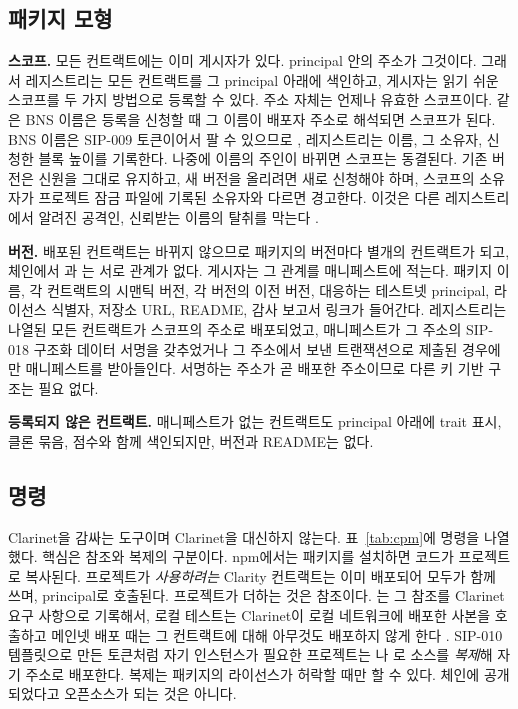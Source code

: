 \subsection{패키지 모형}

\textbf{스코프.} 모든 컨트랙트에는 이미 게시자가 있다. principal 안의 주소가 그것이다. 그래서 레지스트리는 모든 컨트랙트를 그 principal 아래에 색인하고, 게시자는 읽기 쉬운 스코프를 두 가지 방법으로 등록할 수 있다. 주소 자체는 언제나 유효한 스코프이다.  같은 BNS 이름은 등록을 신청할 때 그 이름이 배포자 주소로 해석되면 스코프가 된다. BNS 이름은 SIP-009 토큰이어서 팔 수 있으므로 \cite{bnsv2}, 레지스트리는 이름, 그 소유자, 신청한 블록 높이를 기록한다. 나중에 이름의 주인이 바뀌면 스코프는 동결된다. 기존 버전은 신원을 그대로 유지하고, 새 버전을 올리려면 새로 신청해야 하며, 스코프의 소유자가 프로젝트 잠금 파일에 기록된 소유자와 다르면  경고한다. 이것은 다른 레지스트리에서 알려진 공격인, 신뢰받는 이름의 탈취를 막는다 \cite{ladisa2023sok}.

\textbf{버전.} 배포된 컨트랙트는 바뀌지 않으므로 패키지의 버전마다 별개의 컨트랙트가 되고, 체인에서 과 는 서로 관계가 없다. 게시자는 그 관계를 매니페스트에 적는다. 패키지 이름, 각 컨트랙트의 시맨틱 버전, 각 버전의 이전 버전, 대응하는 테스트넷 principal, 라이선스 식별자, 저장소 URL, README, 감사 보고서 링크가 들어간다. 레지스트리는 나열된 모든 컨트랙트가 스코프의 주소로 배포되었고, 매니페스트가 그 주소의 SIP-018 구조화 데이터 서명을 갖추었거나 \cite{sip018} 그 주소에서 보낸 트랜잭션으로 제출된 경우에만 매니페스트를 받아들인다. 서명하는 주소가 곧 배포한 주소이므로 다른 키 기반 구조는 필요 없다.

\textbf{등록되지 않은 컨트랙트.} 매니페스트가 없는 컨트랙트도 principal 아래에 trait 표시, 클론 묶음, 점수와 함께 색인되지만, 버전과 README는 없다.

\subsection{명령}

 Clarinet을 감싸는 도구이며 Clarinet을 대신하지 않는다. 표~\ref{tab:cpm}에 명령을 나열했다. 핵심은 참조와 복제의 구분이다. npm에서는 패키지를 설치하면 코드가 프로젝트로 복사된다. 프로젝트가 \emph{사용하려는} Clarity 컨트랙트는 이미 배포되어 모두가 함께 쓰며, principal로 호출된다. 프로젝트가 더하는 것은 참조이다. 는 그 참조를 Clarinet 요구 사항으로 기록해서, 로컬 테스트는 Clarinet이 로컬 네트워크에 배포한 사본을 호출하고 메인넷 배포 때는 그 컨트랙트에 대해 아무것도 배포하지 않게 한다 \cite{clarinet}. SIP-010 템플릿으로 만든 토큰처럼 자기 인스턴스가 필요한 프로젝트는 나 로 소스를 \emph{복제}해 자기 주소로 배포한다. 복제는 패키지의 라이선스가 허락할 때만 할 수 있다. 체인에 공개되었다고 오픈소스가 되는 것은 아니다.

